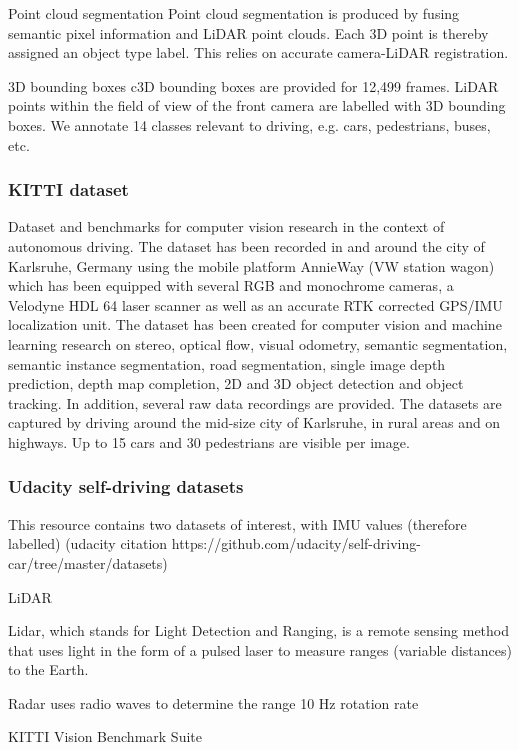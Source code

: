 Point cloud segmentation
Point cloud segmentation is produced by fusing semantic pixel information and LiDAR point clouds. Each 3D point is thereby assigned an object type label. This relies on accurate camera-LiDAR registration.

3D bounding boxes
c3D bounding boxes are provided for 12,499 frames. LiDAR points within the field of view of the front camera are labelled with 3D bounding boxes. We annotate 14 classes relevant to driving, e.g. cars, pedestrians, buses, etc.

\subsubsection{KITTI dataset}

Dataset and benchmarks for computer vision research in the context of autonomous driving. The dataset has been recorded in and around the city of Karlsruhe, Germany using the mobile platform AnnieWay (VW station wagon) which has been equipped with several RGB and monochrome cameras, a Velodyne HDL 64 laser scanner as well as an accurate RTK corrected GPS/IMU localization unit. The dataset has been created for computer vision and machine learning research on stereo, optical flow, visual odometry, semantic segmentation, semantic instance segmentation, road segmentation, single image depth prediction, depth map completion, 2D and 3D object detection and object tracking. In addition, several raw data recordings are provided. The datasets are captured by driving around the mid-size city of Karlsruhe, in rural areas and on highways. Up to 15 cars and 30 pedestrians are visible per image.

\subsubsection{Udacity self-driving datasets}

This resource contains two datasets of interest, with IMU values (therefore labelled) (udacity citation https://github.com/udacity/self-driving-car/tree/master/datasets)

LiDAR

Lidar, which stands for Light Detection and Ranging, is a remote sensing method that uses light in the form of a pulsed laser to measure ranges (variable distances) to the Earth.

Radar uses radio waves to determine the range
10 Hz rotation rate



KITTI Vision Benchmark Suite

